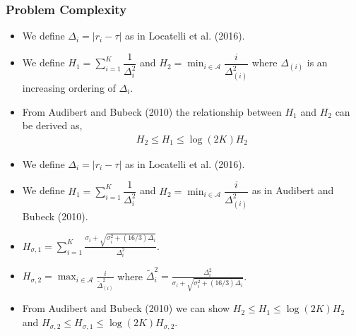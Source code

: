 \begin{frame}
\frametitle{Problem Complexity}
\begin{itemize}
\item<1-> We define $\Delta_i= |r_i - \tau |$ as in Locatelli et al. (2016).
\item<2-> We define $H_{1} = \sum_{i=1}^{K}\dfrac{1}{\Delta_{i}^{2}}$ and $
H_{2} =\min_{i\in \mathcal{A}}\dfrac{i}{{\Delta_{(i)}^{2}}} $ where $\Delta_{(i)}$ is an increasing ordering of ${\Delta}_{i}$.
%
\item<3-> From {Audibert and Bubeck (2010)} the relationship between $H_1$ and $H_2$ can be derived as,
\begin{align*}
H_{2} \leq H_{1}\leq \log(2K)H_{2} 
\end{align*}
\end{itemize}
\end{frame}

\begin{frame}
\begin{itemize}
\item We define $\Delta_i= |r_i - \tau |$ as in Locatelli et al. (2016).
\item We define $H_{1} = \sum_{i=1}^{K}\dfrac{1}{\Delta_{i}^{2}}$ and $
H_{2} =\min_{i\in \mathcal{A}}\dfrac{i}{{\Delta_{(i)}^{2}}}$ as in Audibert and Bubeck (2010).
\item $H_{\sigma,1}=\sum_{i=1}^{K}\frac{\sigma_{i}+\sqrt{\sigma_{i}^{2}+(16/3)\Delta_{i}}}{\Delta_{i}^{2}}$.
\item $H_{\sigma,2}=\max_{i\in \mathcal{A}} \frac{i}{\tilde{\Delta}_{(i)}^{2}}$ where $\tilde{\Delta}_{i}^{2}=\frac{\Delta_{i}^{2}}{\sigma_{i}+\sqrt{\sigma_{i}^{2}+(16/3)\Delta_{i}}}$.
\item From Audibert and Bubeck (2010) we can show $H_{2} \leq H_{1}\leq \log(2K)H_{2}$ and $H_{\sigma,2}\le H_{\sigma,1} \le \log(2K) H_{\sigma,2}$.
\end{itemize}
\end{frame}

